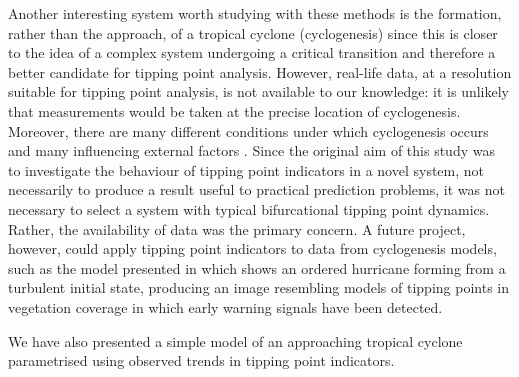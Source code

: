 


Another interesting system worth studying with these methods is the formation, rather than the approach, of a tropical cyclone (cyclogenesis) since this is closer to the idea of a complex system undergoing a critical transition \citep{scheffer2009} and therefore a better candidate for tipping point analysis. However, real-life data, at a resolution suitable for tipping point analysis, is not available to our knowledge: it is unlikely that measurements would be taken at the precise location of cyclogenesis. Moreover, there are many different conditions under which cyclogenesis occurs \citep{graf2017objective, kilroy2017unified} and many influencing external factors \citep{schreck2015kelvin}. Since the original aim of this study was to investigate the behaviour of tipping point indicators in a novel system, not necessarily to produce a result useful to practical prediction problems, it was not necessary to select a system with typical bifurcational tipping point dynamics. Rather, the availability of data was the primary concern. A future project, however, could apply tipping point indicators to data from cyclogenesis models, such as the model presented in \citet{schecter2009hurricane} which shows an ordered hurricane forming from a turbulent initial state, producing an image resembling models of tipping points in vegetation coverage \citep{dakos2011slowing, kefi2014early} in which early warning signals have been detected.

We have also presented a simple model of an approaching tropical cyclone parametrised using observed trends in tipping point indicators. {}